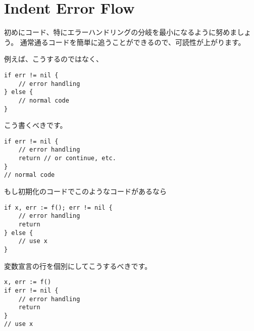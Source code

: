 \section{Indent Error Flow}

初めにコード、特にエラーハンドリングの分岐を最小になるように努めましょう。 通常通るコードを簡単に追うことができるので、可読性が上がります。

例えば、こうするのではなく、

\begin{lstlisting}[]
if err != nil {
    // error handling
} else {
    // normal code
}
\end{lstlisting}

こう書くべきです。

\begin{lstlisting}[]
if err != nil {
    // error handling
    return // or continue, etc.
}
// normal code
\end{lstlisting}

もし初期化のコードでこのようなコードがあるなら

\begin{lstlisting}[]
if x, err := f(); err != nil {
    // error handling
    return
} else {
    // use x
}
\end{lstlisting}

変数宣言の行を個別にしてこうするべきです。

\begin{lstlisting}[]
x, err := f()
if err != nil {
    // error handling
    return
}
// use x
\end{lstlisting}
